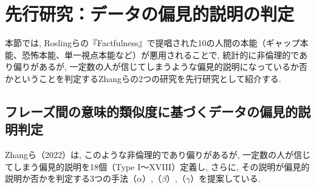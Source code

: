 \documentclass[dvipdfmx]{jsarticle}
\begin{document}
\section{先行研究：データの偏見的説明の判定}

本節では, Roslingらの『Factfulness』で提唱された10の人間の本能（ギャップ本能、恐怖本能、単一視点本能など）\cite{rosling2018}が悪用されることで, 統計的に非倫理的であり偏りがあるが, 一定数の人が信じてしまうような偏見的説明になっているか否かということを判定するZhangらの2つの研究を先行研究として紹介する\cite{zhang2022, zhang2023}.

\subsection{フレーズ間の意味的類似度に基づくデータの偏見的説明判定}
Zhangら（2022）は, このような非倫理的であり偏りがあるが, 一定数の人が信じてしまう偏見的説明を18個（Type I～XVIII）定義し, さらに, その説明が偏見的説明か否かを判定する3つの手法（$\alpha$）,（$\beta$）,（$\gamma$）を提案している\cite{zhang2022}.
\end{document}
